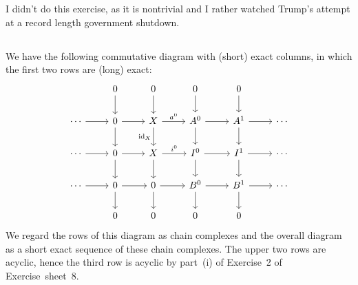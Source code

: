 \section{}





\subsection{}

I didn’t do this exercise, as it is nontrivial and I rather watched Trump’s attempt at a record length government shutdown.




\subsection{}

We have the following commutative diagram with (short) exact columns, in which the first two rows are (long) exact:
\[
  \begin{tikzcd}
      {}
    & 0
      \arrow{d}
    & 0
      \arrow{d}
    & 0
      \arrow{d}
    & 0
      \arrow{d}
    & {}
    \\
      \dotsb
      \arrow{r}
    & 0
      \arrow{r}
      \arrow{d}
    & X
      \arrow{r}[above]{a^0}
      \arrow{d}[left]{\id_X}
    & A^0
      \arrow{r}
      \arrow{d}
    & A^1
      \arrow{r}
      \arrow{d}
    & \dotsb
    \\
      \dotsb
      \arrow{r}
    & 0
      \arrow{r}
      \arrow{d}
    & X
      \arrow{r}[above]{i^0}
      \arrow{d}
    & I^0
      \arrow{r}
      \arrow{d}
    & I^1
      \arrow{r}
      \arrow{d}
    & \dotsb
    \\
      \dotsb
      \arrow{r}
    & 0
      \arrow{r}
      \arrow{d}
    & 0
      \arrow{r}
      \arrow{d}
    & B^0
      \arrow{r}
      \arrow{d}
    & B^1
      \arrow{r}
      \arrow{d}
    & \dotsb
    \\
      {}
    & 0
    & 0
    & 0
    & 0
    & {}
  \end{tikzcd}
\]
We regard the rows of this diagram as chain complexes and the overall diagram as a short exact sequence of these chain complexes.
The upper two rows are acyclic, hence the third row is acyclic by part~(i) of Exercise~2 of Exercise~sheet~8.





\subsection{}

